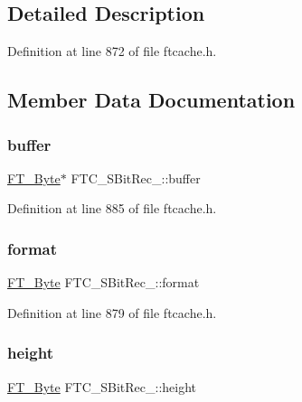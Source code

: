 \subsection{Detailed Description}


Definition at line 872 of file ftcache.\+h.



\subsection{Member Data Documentation}
\mbox{\label{struct_f_t_c___s_bit_rec___abe4d78fc3f411d67e7fc43f7aa21bd1d}} 
\subsubsection{\texorpdfstring{buffer}{buffer}}
{\footnotesize\ttfamily \mbox{\hyperlink{fttypes_8h_a51f26183ca0c9f4af958939648caeccd}{F\+T\+\_\+\+Byte}}$\ast$ F\+T\+C\+\_\+\+S\+Bit\+Rec\+\_\+\+::buffer}



Definition at line 885 of file ftcache.\+h.

\mbox{\label{struct_f_t_c___s_bit_rec___a3d3fcc2869ce5c95f0f63898e6cef8be}} 
\subsubsection{\texorpdfstring{format}{format}}
{\footnotesize\ttfamily \mbox{\hyperlink{fttypes_8h_a51f26183ca0c9f4af958939648caeccd}{F\+T\+\_\+\+Byte}} F\+T\+C\+\_\+\+S\+Bit\+Rec\+\_\+\+::format}



Definition at line 879 of file ftcache.\+h.

\mbox{\label{struct_f_t_c___s_bit_rec___a5953efe2aded3b184875d5e5d08cafef}} 
\subsubsection{\texorpdfstring{height}{height}}
{\footnotesize\ttfamily \mbox{\hyperlink{fttypes_8h_a51f26183ca0c9f4af958939648caeccd}{F\+T\+\_\+\+Byte}} F\+T\+C\+\_\+\+S\+Bit\+Rec\+\_\+\+::height}



